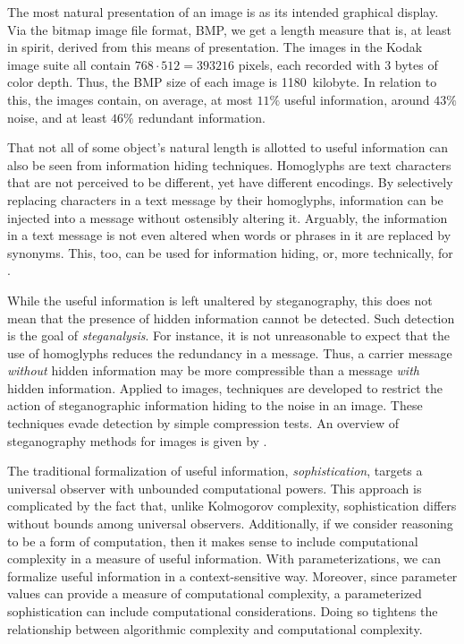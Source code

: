 \begin{example}[continued]
\label{ex:bmp_png_jpeg}%
  The most natural presentation of an image is as its intended graphical display.
  Via the bitmap image file format, BMP, we get a length measure that is, at least in spirit, derived from this means of presentation.
  The images in the Kodak image suite all contain $768 \cdot 512 = 393216$ pixels, each recorded with $3$ bytes of color depth.
  Thus, the BMP size of each image is 1180~kilobyte.
  In relation to this, the images contain, on average, at most $11\%$ useful information, around $43\%$ noise, and at least $46\%$ redundant information.
\end{example}

That not all of some object's natural length is allotted to useful information can also be seen from information hiding techniques.
Homoglyphs are text characters that are not perceived to be different, yet have different encodings.
By selectively replacing characters in a text message by their homoglyphs, information can be injected into a message without ostensibly altering it.
Arguably, the information in a text message is not even altered when words or phrases in it are replaced by synonyms.
This, too, can be used for information hiding, or, more technically, for  \parencite{hosmani2015dual}.

While the useful information is left unaltered by steganography, this does not mean that the presence of hidden information cannot be detected.
Such detection is the goal of \emph{steganalysis}.
For instance, it is not unreasonable to expect that the use of homoglyphs reduces the redundancy in a message.
Thus, a carrier message \emph{without} hidden information may be more compressible than a message \emph{with} hidden information.
Applied to images, techniques are developed to restrict the action of steganographic information hiding to the noise in an image.
These techniques evade detection by simple compression tests.
An overview of steganography methods for images is given by \textcite{cheddad2010digital}.

The traditional formalization of useful information, \emph{sophistication}, targets a universal observer with unbounded computational powers.
This approach is complicated by the fact that, unlike Kolmogorov complexity, sophistication differs without bounds among universal observers.
Additionally, if we consider reasoning to be a form of computation, then it makes sense to include computational complexity in a measure of useful information.
With parameterizations, we can formalize useful information in a context-sensitive way.
Moreover, since parameter values can provide a measure of computational complexity, a parameterized sophistication can include computational considerations.
Doing so tightens the relationship between algorithmic complexity and computational complexity.

